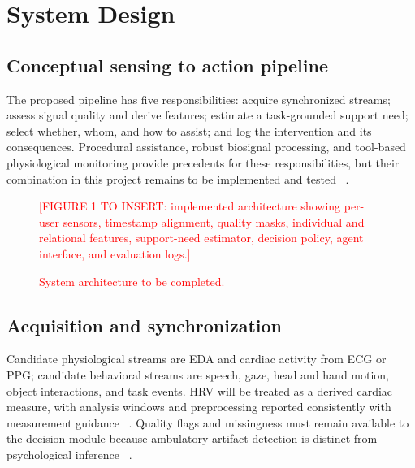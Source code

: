 \section{System Design}
\label{sec:6}

\subsection{Conceptual sensing to action pipeline}

The proposed pipeline has five responsibilities: acquire synchronized streams; assess signal quality and derive features; estimate a task-grounded support need; select whether, whom, and how to assist; and log the intervention and its consequences. Procedural assistance, robust biosignal processing, and tool-based physiological monitoring provide precedents for these responsibilities, but their combination in this project remains to be implemented and tested ~\cite{pro2,deep,artifacts,vital}.

\begin{figure}[t]
\centering
\textcolor{red}{\parbox{0.90\linewidth}{[FIGURE 1 TO INSERT: implemented architecture showing per-user sensors, timestamp alignment, quality masks, individual and relational features, support-need estimator, decision policy, agent interface, and evaluation logs.]}}
\par\rule{0pt}{18mm}
\caption{\textcolor{red}{System architecture to be completed.}}
\label{fig:architecture}
\end{figure}


\subsection{Acquisition and synchronization}

Candidate physiological streams are EDA and cardiac activity from ECG or PPG; candidate behavioral streams are speech, gaze, head and hand motion, object interactions, and task events. HRV will be treated as a derived cardiac measure, with analysis windows and preprocessing reported consistently with measurement guidance ~\cite{p59,p61}. Quality flags and missingness must remain available to the decision module because ambulatory artifact detection is distinct from psychological inference ~\cite{artifacts}.

